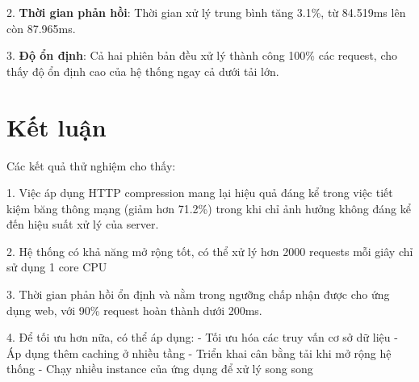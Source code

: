 2. \textbf{Thời gian phản hồi}: Thời gian xử lý trung bình tăng 3.1\%, từ 84.519ms lên còn 87.965ms.

3. \textbf{Độ ổn định}: Cả hai phiên bản đều xử lý thành công 100\% các request, cho thấy độ ổn định cao của hệ thống ngay cả dưới tải lớn.

\section{Kết luận}

Các kết quả thử nghiệm cho thấy:

1. Việc áp dụng HTTP compression mang lại hiệu quả đáng kể trong việc tiết kiệm băng thông mạng (giảm hơn 71.2\%) trong khi chỉ ảnh hưởng không đáng kể đến hiệu suất xử lý của server.

2. Hệ thống có khả năng mở rộng tốt, có thể xử lý hơn 2000 requests mỗi giây chỉ sử dụng 1 core CPU

3. Thời gian phản hồi ổn định và nằm trong ngưỡng chấp nhận được cho ứng dụng web, với 90\% request hoàn thành dưới 200ms.

4. Để tối ưu hơn nữa, có thể áp dụng:
   - Tối ưu hóa các truy vấn cơ sở dữ liệu
   - Áp dụng thêm caching ở nhiều tầng
   - Triển khai cân bằng tải khi mở rộng hệ thống
   - Chạy nhiều instance của ứng dụng để xử lý song song


